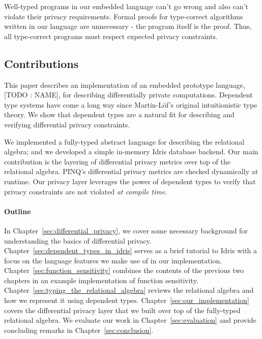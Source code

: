 \documentclass[12pt]{article}
\begin{document}
Well-typed programs in our embedded language can't go wrong and also can't violate their privacy requirements.
Formal proofs for type-correct algorithms written in our language are unnecessary - the program itself is the proof.
Thus, all type-correct programs must respect expected privacy constraints.

\subsection{Contributions}

This paper describes an implementation of an embedded prototype language, [TODO : NAME], for describing differentially private computations.
Dependent type systems have come a long way since Martin-L\"of's original intuitionistic type theory.
We show that dependent types are a natural fit for describing and verifying differential privacy constraints.

We implemented a fully-typed abstract language for describing the relational algebra; and we developed a simple in-memory Idris database backend.
Our main contribution is the layering of differential privacy metrics over top of the relational algebra.
PINQ's differential privacy metrics are checked dynamically at runtime.
Our privacy layer leverages the power of dependent types to verify that privacy constraints are not violated \textit{at compile time}.


\paragraph{Outline}


In Chapter~\ref{sec:differential_privacy}, we cover some necessary background for understanding the basics of differential privacy.
Chapter~\ref{sec:dependent_types_in_idris} serves as a brief tutorial to Idris with a focus on the language features we make use of in our implementation.
Chapter~\ref{sec:function_sensitivity} combines the contents of the previous two chapters in an example implementation of function sensitivity.
Chapter~\ref{sec:typing_the_relational_algebra} reviews the relational algebra and how we represent it using dependent types.
Chapter~\ref{sec:our_implementation} covers the differential privacy layer that we built over top of the fully-typed relational algebra.
We evaluate our work in Chapter~\ref{sec:evaluation} and provide concluding remarks in Chapter~\ref{sec:conclusion}.
\end{document}
